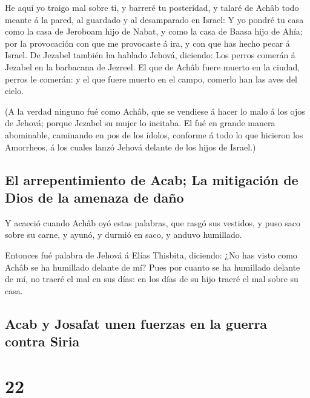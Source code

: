  He aquí yo traigo mal sobre ti, y barreré tu posteridad,
y talaré de Achâb todo meante á la pared, al guardado y al desamparado
en Israel:  Y yo pondré tu casa como la casa de Jeroboam
hijo de Nabat, y como la casa de Baasa hijo de Ahía; por la provocación
con que me provocaste á ira, y con que has hecho pecar á Israel.
 De Jezabel también ha hablado Jehová, diciendo: Los
perros comerán á Jezabel en la barbacana de Jezreel.  El
que de Achâb fuere muerto en la ciudad, perros le comerán: y el que
fuere muerto en el campo, comerlo han las aves del cielo.

 (A la verdad ninguno fué como Achâb, que se vendiese á
hacer lo malo á los ojos de Jehová; porque Jezabel su mujer lo incitaba.
 El fué en grande manera abominable, caminando en pos de
los ídolos, conforme á todo lo que hicieron los Amorrheos, á los cuales
lanzó Jehová delante de los hijos de Israel.)

\hypertarget{el-arrepentimiento-de-acab-la-mitigaciuxf3n-de-dios-de-la-amenaza-de-dauxf1o}{%
\subsection{El arrepentimiento de Acab; La mitigación de Dios de la
amenaza de
daño}\label{el-arrepentimiento-de-acab-la-mitigaciuxf3n-de-dios-de-la-amenaza-de-dauxf1o}}

 Y acaeció cuando Achâb oyó estas palabras, que rasgó sus
vestidos, y puso saco sobre su carne, y ayunó, y durmió en saco, y
anduvo humillado.

 Entonces fué palabra de Jehová á Elías Thisbita,
diciendo:  ¿No has visto como Achâb se ha humillado
delante de mí? Pues por cuanto se ha humillado delante de mí, no traeré
el mal en sus días: en los días de su hijo traeré el mal sobre su casa.

\hypertarget{acab-y-josafat-unen-fuerzas-en-la-guerra-contra-siria}{%
\subsection{Acab y Josafat unen fuerzas en la guerra contra
Siria}\label{acab-y-josafat-unen-fuerzas-en-la-guerra-contra-siria}}

\hypertarget{section-11-22}{%
\section{22}\label{section-11-22}}

